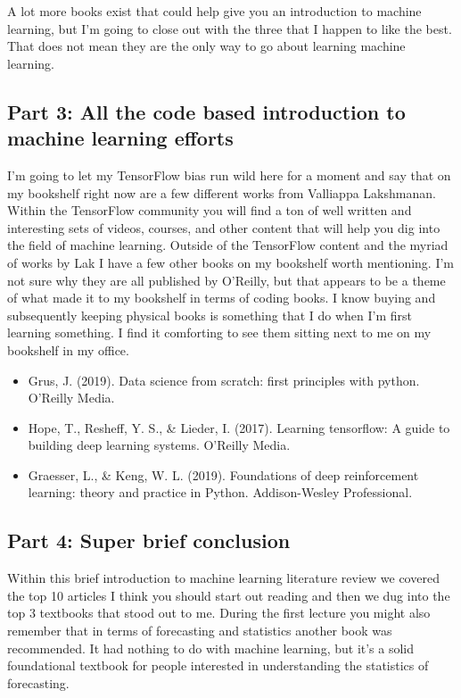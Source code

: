 \documentclass{article}
\begin{document}
A lot more books exist that could help give you an introduction to machine learning, but I’m going to close out with the three that I happen to like the best. That does not mean they are the only way to go about learning machine learning. 
\subsection{Part 3: All the code based introduction to machine learning efforts}
I’m going to let my TensorFlow bias run wild here for a moment and say that on my bookshelf right now are a few different works from Valliappa Lakshmanan. Within the TensorFlow community you will find a ton of well written and interesting sets of videos, courses, and other content that will help you dig into the field of machine learning. Outside of the TensorFlow content and the myriad of works by Lak I have a few other books on my bookshelf worth mentioning. I’m not sure why they are all published by O’Reilly, but that appears to be a theme of what made it to my bookshelf in terms of coding books. I know buying and subsequently keeping physical books is something that I do when I’m first learning something. I find it comforting to see them sitting next to me on my bookshelf in my office. 

\begin{itemize}
\item Grus, J. (2019). Data science from scratch: first principles with python. O'Reilly Media. \cite{grus2019data}
\item Hope, T., Resheff, Y. S., \& Lieder, I. (2017). Learning tensorflow: A guide to building deep learning systems. O'Reilly Media. \cite{hope2017learning} 
\item Graesser, L., \& Keng, W. L. (2019). Foundations of deep reinforcement learning: theory and practice in Python. Addison-Wesley Professional. \cite{graesser2019foundations}
\end{itemize}
\subsection{Part 4: Super brief conclusion}
Within this brief introduction to machine learning literature review we covered the top 10 articles I think you should start out reading and then we dug into the top 3 textbooks that stood out to me. During the first lecture you might also remember that in terms of forecasting and statistics another book was recommended. It had nothing to do with machine learning, but it's a solid foundational textbook for people interested in understanding the statistics of forecasting. 
\end{document}
